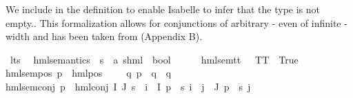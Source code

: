 \begin{isabellebody}
\begin{isamarkuptext}
We include  in the definition to enable Isabelle to infer that the type  is not empty..
This formalization allows for conjunctions of arbitrary - even of infinite - width and has been
taken from \cite{Pohlmann2021ReducingReactive} (Appendix B).%
\end{isamarkuptext}\isamarkuptrue%
\isamarkupfalse%
\ lts\ \isanewline
\isanewline
{}\isamarkupfalse%
\ hml{\isacharunderscore}{\kern0pt}semantics\ {\isacharcolon}{\kern0pt}{\isacharcolon}{\kern0pt}\ {\isacartoucheopen}{\isacharprime}{\kern0pt}s\ {\isasymRightarrow}\ {\isacharparenleft}{\kern0pt}{\isacharprime}{\kern0pt}a{\isacharcomma}{\kern0pt}\ {\isacharprime}{\kern0pt}s{\isacharparenright}{\kern0pt}hml\ {\isasymRightarrow}\ bool{\isacartoucheclose}\isanewline
{\isacharparenleft}{\kern0pt}{\isacartoucheopen}{\isacharunderscore}{\kern0pt}\ {\isasymTurnstile}\ {\isacharunderscore}{\kern0pt}{\isacartoucheclose}\ {\isacharbrackleft}{\kern0pt}{}{}{\isacharcomma}{\kern0pt}\ {}{}{\isacharbrackright}{\kern0pt}\ {}{}{\isacharparenright}{\kern0pt}\isanewline
{}\isanewline
hml{\isacharunderscore}{\kern0pt}sem{\isacharunderscore}{\kern0pt}tt{\isacharcolon}{\kern0pt}\ {\isacartoucheopen}{\isacharparenleft}{\kern0pt}{\isacharunderscore}{\kern0pt}\ {\isasymTurnstile}\ TT{\isacharparenright}{\kern0pt}\ {\isacharequal}{\kern0pt}\ True{\isacartoucheclose}\ {\isacharbar}{\kern0pt}\isanewline
hml{\isacharunderscore}{\kern0pt}sem{\isacharunderscore}{\kern0pt}pos{\isacharcolon}{\kern0pt}\ {\isacartoucheopen}{\isacharparenleft}{\kern0pt}p\ {\isasymTurnstile}\ {\isacharparenleft}{\kern0pt}hml{\isacharunderscore}{\kern0pt}pos\ {\isasymalpha}\ {\isasymphi}{\isacharparenright}{\kern0pt}{\isacharparenright}{\kern0pt}\ {\isacharequal}{\kern0pt}\ {\isacharparenleft}{\kern0pt}{\isasymexists}\ q{\isachardot}{\kern0pt}\ {\isacharparenleft}{\kern0pt}p\ {\isasymmapsto}{\isasymalpha}\ q{\isacharparenright}{\kern0pt}\ {\isasymand}\ q\ {\isasymTurnstile}\ {\isasymphi}{\isacharparenright}{\kern0pt}{\isacartoucheclose}\ {\isacharbar}{\kern0pt}\isanewline
hml{\isacharunderscore}{\kern0pt}sem{\isacharunderscore}{\kern0pt}conj{\isacharcolon}{\kern0pt}\ {\isacartoucheopen}{\isacharparenleft}{\kern0pt}p\ {\isasymTurnstile}\ {\isacharparenleft}{\kern0pt}hml{\isacharunderscore}{\kern0pt}conj\ I\ J\ {\isasympsi}s{\isacharparenright}{\kern0pt}{\isacharparenright}{\kern0pt}\ {\isacharequal}{\kern0pt}\ {\isacharparenleft}{\kern0pt}{\isacharparenleft}{\kern0pt}{\isasymforall}i\ {\isasymin}\ I{\isachardot}{\kern0pt}\ p\ {\isasymTurnstile}\ {\isacharparenleft}{\kern0pt}{\isasympsi}s\ i{\isacharparenright}{\kern0pt}{\isacharparenright}{\kern0pt}\ {\isasymand}\ {\isacharparenleft}{\kern0pt}{\isasymforall}j\ {\isasymin}\ J{\isachardot}{\kern0pt}\ {\isasymnot}{\isacharparenleft}{\kern0pt}p\ {\isasymTurnstile}\ {\isacharparenleft}{\kern0pt}{\isasympsi}s\ j{\isacharparenright}{\kern0pt}{\isacharparenright}{\kern0pt}{\isacharparenright}{\kern0pt}{\isacharparenright}{\kern0pt}{\isacartoucheclose}\isanewline

\end{isabellebody}
